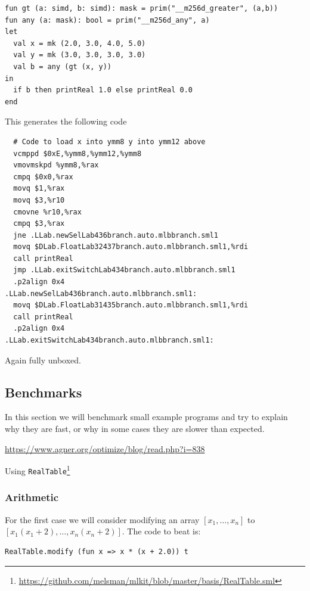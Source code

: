 \documentclass{article}
\begin{document}
\begin{lstlisting}
fun gt (a: simd, b: simd): mask = prim("__m256d_greater", (a,b))
fun any (a: mask): bool = prim("__m256d_any", a)
let
  val x = mk (2.0, 3.0, 4.0, 5.0)
  val y = mk (3.0, 3.0, 3.0, 3.0)
  val b = any (gt (x, y))
in 
  if b then printReal 1.0 else printReal 0.0
end
\end{lstlisting}

This generates the following code

\begin{verbatim}
  # Code to load x into ymm8 y into ymm12 above
  vcmppd $0xE,%ymm8,%ymm12,%ymm8
  vmovmskpd %ymm8,%rax
  cmpq $0x0,%rax
  movq $1,%rax
  movq $3,%r10
  cmovne %r10,%rax
  cmpq $3,%rax
  jne .LLab.newSelLab436branch.auto.mlbbranch.sml1
  movq $DLab.FloatLab32437branch.auto.mlbbranch.sml1,%rdi
  call printReal
  jmp .LLab.exitSwitchLab434branch.auto.mlbbranch.sml1
  .p2align 0x4
.LLab.newSelLab436branch.auto.mlbbranch.sml1:
  movq $DLab.FloatLab31435branch.auto.mlbbranch.sml1,%rdi
  call printReal
  .p2align 0x4
.LLab.exitSwitchLab434branch.auto.mlbbranch.sml1:
\end{verbatim}

Again fully unboxed.

\subsection{Benchmarks}

In this section we will benchmark small example programs and try to explain why they are fast, or why in some cases they are slower than expected.

\url{https://www.agner.org/optimize/blog/read.php?i=838}

Using \texttt{RealTable}\footnote{\url{https://github.com/melsman/mlkit/blob/master/basis/RealTable.sml}}

\subsubsection{Arithmetic}

For the first case we will consider modifying an array $[x_1, \ldots, x_n]$ to $[x_1(x_1 + 2), \ldots, x_n(x_n + 2)]$. The code to beat is:
\begin{lstlisting}
RealTable.modify (fun x => x * (x + 2.0)) t
\end{lstlisting}
\end{document}
